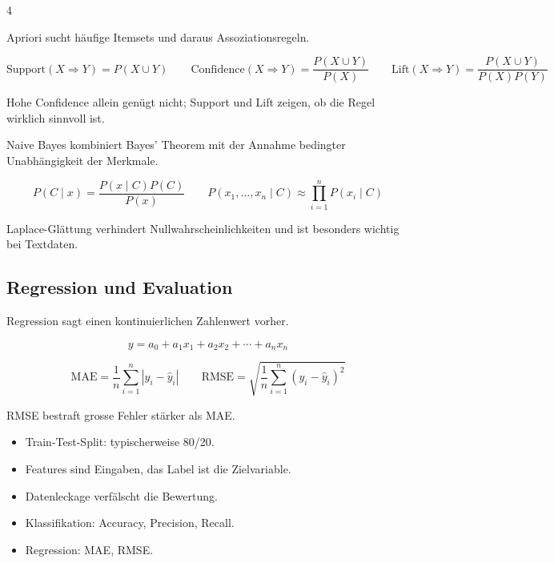 \begin{landscape}
\begin{multicols*}{4}
        \begin{cheatSheetBox}[title=Apriori]
            Apriori sucht häufige Itemsets und daraus Assoziationsregeln.

            \[
                \text{Support}(X\Rightarrow Y)=P(X\cup Y)
                \qquad
                \text{Confidence}(X\Rightarrow Y)=\frac{P(X\cup Y)}{P(X)}
                \qquad
                \text{Lift}(X\Rightarrow Y)=\frac{P(X\cup Y)}{P(X)P(Y)}
            \]

            Hohe Confidence allein genügt nicht; Support und Lift zeigen, ob die Regel wirklich sinnvoll ist.
        \end{cheatSheetBox}

        \begin{cheatSheetBox}[title=Naive Bayes]
            Naive Bayes kombiniert Bayes' Theorem mit der Annahme bedingter Unabhängigkeit der Merkmale.

            \[
                P(C\mid x)=\frac{P(x\mid C)P(C)}{P(x)}
                \qquad
                P(x_1,\ldots,x_n\mid C)\approx\prod_{i=1}^{n}P(x_i\mid C)
            \]

            Laplace-Glättung verhindert Nullwahrscheinlichkeiten und ist besonders wichtig bei Textdaten.
        \end{cheatSheetBox}

        \columnbreak\textcolor{\cheatSheetColor}{\subsection*{Regression und Evaluation}}

        \begin{cheatSheetBox}[title=Regression]
            Regression sagt einen kontinuierlichen Zahlenwert vorher.

            \[
                y=a_0+a_1x_1+a_2x_2+\cdots+a_nx_n
            \]

            \[
                \text{MAE}=\frac{1}{n}\sum_{i=1}^{n}|y_i-\hat{y}_i|
                \qquad
                \text{RMSE}=\sqrt{\frac{1}{n}\sum_{i=1}^{n}(y_i-\hat{y}_i)^2}
            \]

            RMSE bestraft grosse Fehler stärker als MAE.
        \end{cheatSheetBox}

        \begin{cheatSheetBox}[title=Datenvorbereitung]
            \begin{itemize}
                \item Train-Test-Split: typischerweise 80/20.
                \item Features sind Eingaben, das Label ist die Zielvariable.
                \item Datenleckage verfälscht die Bewertung.
                \item Klassifikation: Accuracy, Precision, Recall.
                \item Regression: MAE, RMSE.
            \end{itemize}
        \end{cheatSheetBox}


\end{multicols*}
\end{landscape}
